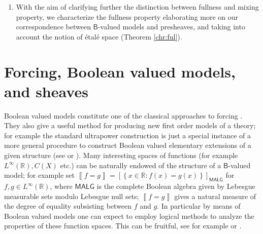 \documentclass[11pt]{amsart}
\theoremstyle{plain}
\theoremstyle{definition}
\theoremstyle{plain}
\theoremstyle{remark}
\newcommand{\bool}[1]{\mathsf{#1}}
\newcommand{\qp}[1]{\left[ #1 \right]}
\newcommand{\Qp}[1]{\left\llbracket #1 \right\rrbracket}
\newcommand{\bp}[1]{\left\lbrace #1 \right\rbrace}
\newcommand{\0}{\mathsf{0}}
\renewcommand{\1}{\mathsf{1}}
\renewcommand{\2}{\mathsf{2}}
\theoremstyle{definition}
\begin{document}
\begin{enumerate}
\item \label{etal:sp}
With the aim of clarifying further the distinction between fullness and mixing property,
we characterize the fullness property elaborating more on our correspondence between $\bool{B}$-valued models and presheaves, 
and taking into account the notion of \'etal\'e space (Theorem \ref{chr:ful}).


\end{enumerate}



\section*{Forcing, Boolean valued models, and sheaves}
Boolean valued models constitute one of the classical approaches to forcing \cite{BELL,JECH}. 
They also give a useful method for producing new first order models of a theory; for example the standard ultrapower construction is 
just a special instance of a more general procedure to construct Boolean valued elementary extensions of a given structure 
(see \cite{VIAUSAX} or \cite{MANS71}). 
Many interesting spaces of functions (for example $L^\infty(\mathbb{R}), C(X)$ etc.) can be naturally endowed of 
the structure of a $\bool{B}$-valued model; for example set $\Qp{f=g}=\qp{\bp{x\in \mathbb{R}: f(x)=g(x)}}_{\bool{MALG}}$ 
for $f,g\in L^\infty(\mathbb{R})$, where $\bool{MALG}$ is the complete Boolean algebra given by 
Lebesgue measurable sets modulo Lebesgue null sets; $\Qp{f=g}$ gives a natural measure of the degree of equality 
subsisting between $f$ and $g$. In particular by means of Boolean valued models one can expect to employ logical methods to analyze 
the properties of these function spaces. This can be fruitful, see for example \cite{VIASCHANUEL} or 
\cite{MR779056,MR759416,VIAVAC15}.\\
\end{document}

